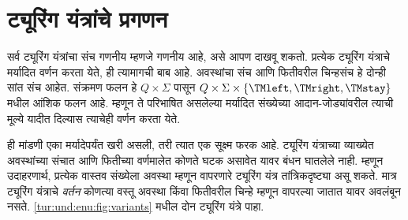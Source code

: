 \section{ट्यूरिंग यंत्रांचे प्रगणन}\label{tur:und:enu:sec}

\begin{explain}
सर्व ट्यूरिंग यंत्रांचा संच गणनीय म्हणजे गणनीय
आहे, असे आपण दाखवू शकतो. प्रत्येक ट्यूरिंग यंत्राचे
मर्यादित वर्णन करता येते, ही त्यामागची बाब आहे. अवस्थांचा
संच आणि फितीवरील चिन्हसंच हे दोन्ही सांत संच आहेत.
संक्रमण फलन हे $Q \times \Sigma$ पासून
$Q \times \Sigma \times \{\TMleft, \TMright, \TMstay\}$
मधील आंशिक फलन आहे. म्हणून ते परिभाषित असलेल्या
मर्यादित संख्येच्या आदान-जोड्यांवरील त्याची मूल्ये
यादीत दिल्यास त्याचेही वर्णन करता येते.

ही मांडणी एका मर्यादेपर्यंत खरी असली, तरी त्यात
एक सूक्ष्म फरक आहे. ट्यूरिंग यंत्राच्या व्याख्येत
अवस्थांच्या संचात आणि फितीच्या वर्णमालेत कोणते
घटक असावेत यावर बंधन घातलेले नाही.
म्हणून उदाहरणार्थ, प्रत्येक वास्तव संख्येला अवस्था
म्हणून वापरणारे ट्यूरिंग यंत्र तांत्रिकदृष्ट्या
असू शकते. मात्र ट्यूरिंग यंत्राचे \emph{वर्तन}
कोणत्या वस्तू अवस्था किंवा फितीवरील चिन्हे म्हणून
वापरल्या जातात यावर अवलंबून नसते.
\ref{tur:und:enu:fig:variants} मधील दोन ट्यूरिंग यंत्रे पाहा.
\begin{figure}
\begin{center}
\\
\end{center}
\end{figure}
\end{explain}
